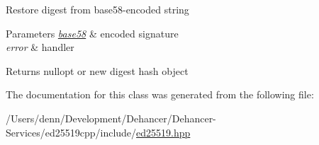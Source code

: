 Restore digest from base58-\/encoded string 
\begin{DoxyParams}{Parameters}
{\em \mbox{\hyperlink{namespaceed25519_1_1base58}{base58}}} & encoded signature \\
\hline
{\em error} & handler \\
\hline
\end{DoxyParams}
\begin{DoxyReturn}{Returns}
nullopt or new digest hash object 
\end{DoxyReturn}


The documentation for this class was generated from the following file\+:\begin{DoxyCompactItemize}
\item 
/\+Users/denn/\+Development/\+Dehancer/\+Dehancer-\/\+Services/ed25519cpp/include/\mbox{\hyperlink{ed25519_8hpp}{ed25519.\+hpp}}\end{DoxyCompactItemize}
